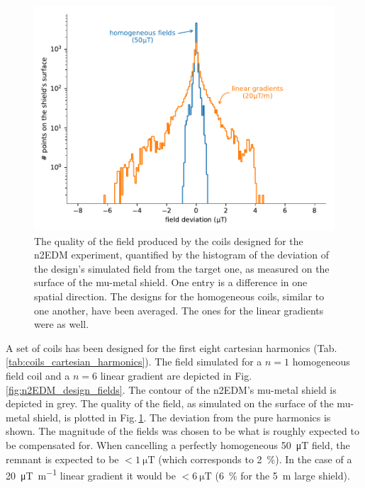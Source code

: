 \begin{figure}
  \centering
  \includegraphics[width=\linewidth]{gfx/prototype/n2EDM_coils_field.pdf}
  \caption{The quality of the field produced by the coils designed for the n2EDM experiment, quantified by the histogram of the deviation of the design's simulated field from the target one, as measured on the surface of the mu-metal shield. One entry is a difference in one spatial direction. The designs for the homogeneous coils, similar to one another, have been averaged. The ones for the linear gradients were as well. }\label{fig:n2EDM_design_deviation}
\end{figure}

A set of coils has been designed for the first eight cartesian harmonics (Tab.\,\ref{tab:coils_cartesian_harmonics}). The field simulated for a $n = 1$ homogeneous field coil and a $n = 6$ linear gradient are depicted in Fig.\,\ref{fig:n2EDM_design_fields}. The contour of the n2EDM's mu-metal shield is depicted in grey. The quality of the field, as simulated on the surface of the mu-metal shield, is plotted in Fig.\,\ref{fig:n2EDM_design_deviation}. The deviation from the pure harmonics is shown. The magnitude of the fields was chosen to be what is roughly expected to be compensated for.
When cancelling a perfectly homogeneous \SI{50}{\micro\tesla} field, the remnant is expected to be $< \SI{1}{\micro\tesla}$ (which corresponds to \SI{2}{\percent}). In the case of a \SI{20}{\micro\tesla\per\meter} linear gradient it would be $< \SI{6}{\micro\tesla}$ (\SI{6}{\percent} for the \SI{5}{\metre} large shield).

